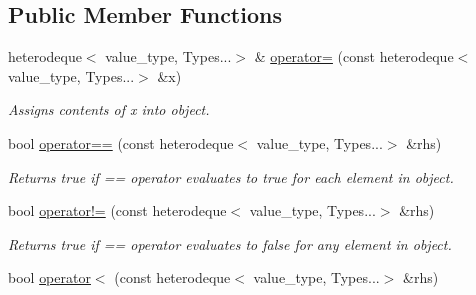 \subsection*{Public Member Functions}
\begin{DoxyCompactItemize}
\item 
\hypertarget{classheterogeneous_1_1heterodeque_3_01_t_00_01_types_8_8_8_4_a49b0868fa7d1d6556374218484562e74}{}heterodeque$<$ value\+\_\+type, Types...$>$ \& \hyperlink{classheterogeneous_1_1heterodeque_3_01_t_00_01_types_8_8_8_4_a49b0868fa7d1d6556374218484562e74}{operator=} (const heterodeque$<$ value\+\_\+type, Types...$>$ \&x)\label{classheterogeneous_1_1heterodeque_3_01_t_00_01_types_8_8_8_4_a49b0868fa7d1d6556374218484562e74}

\begin{DoxyCompactList}\small\item\em Assigns contents of x into object. \end{DoxyCompactList}\item 
\hypertarget{classheterogeneous_1_1heterodeque_3_01_t_00_01_types_8_8_8_4_a260d88998538f1c5e4d9cfbd7190f508}{}bool \hyperlink{classheterogeneous_1_1heterodeque_3_01_t_00_01_types_8_8_8_4_a260d88998538f1c5e4d9cfbd7190f508}{operator==} (const heterodeque$<$ value\+\_\+type, Types...$>$ \&rhs)\label{classheterogeneous_1_1heterodeque_3_01_t_00_01_types_8_8_8_4_a260d88998538f1c5e4d9cfbd7190f508}

\begin{DoxyCompactList}\small\item\em Returns true if == operator evaluates to true for each element in object. \end{DoxyCompactList}\item 
\hypertarget{classheterogeneous_1_1heterodeque_3_01_t_00_01_types_8_8_8_4_a85e7b184bfa259f6fbc8483eb9bac0db}{}bool \hyperlink{classheterogeneous_1_1heterodeque_3_01_t_00_01_types_8_8_8_4_a85e7b184bfa259f6fbc8483eb9bac0db}{operator!=} (const heterodeque$<$ value\+\_\+type, Types...$>$ \&rhs)\label{classheterogeneous_1_1heterodeque_3_01_t_00_01_types_8_8_8_4_a85e7b184bfa259f6fbc8483eb9bac0db}

\begin{DoxyCompactList}\small\item\em Returns true if == operator evaluates to false for any element in object. \end{DoxyCompactList}\item 
\hypertarget{classheterogeneous_1_1heterodeque_3_01_t_00_01_types_8_8_8_4_a0bb7480188534ec2ae46a10f787c82d3}{}bool \hyperlink{classheterogeneous_1_1heterodeque_3_01_t_00_01_types_8_8_8_4_a0bb7480188534ec2ae46a10f787c82d3}{operator$<$} (const heterodeque$<$ value\+\_\+type, Types...$>$ \&rhs)\label{classheterogeneous_1_1heterodeque_3_01_t_00_01_types_8_8_8_4_a0bb7480188534ec2ae46a10f787c82d3}


\end{DoxyCompactItemize}
